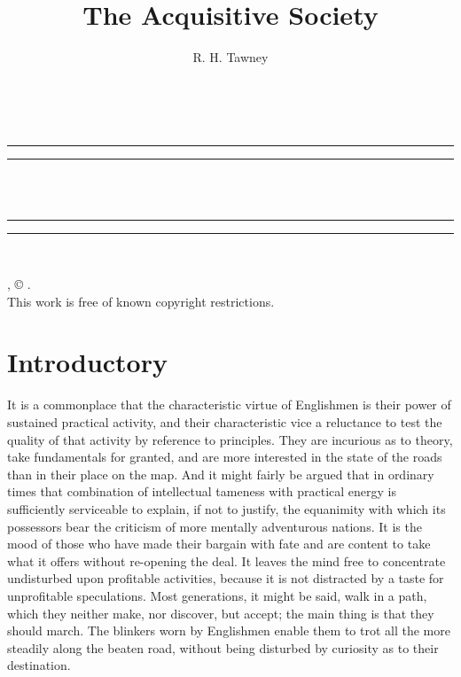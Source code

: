 \documentclass{book}
\date{}
\title{The Acquisitive Society}
\author{R. H. Tawney}
\begin{document}
\thispagestyle{empty}
\begin{center}
	{\Huge \@title   \\[5mm]}
\end{center}
\newpage
\thispagestyle{empty}
\cleardoublepage
\begin{center}
	\thispagestyle{empty}
	\vspace*{\baselineskip}
	\rule{\textwidth}{1.6pt}\vspace*{-\baselineskip}\vspace*{2pt}
	\rule{\textwidth}{0.4pt}\\[\baselineskip]
	{\Huge\scshape \@title   \\[5mm]}
	{\Large }
	\rule{\textwidth}{0.4pt}\vspace*{-\baselineskip}\vspace{3.2pt}
	\rule{\textwidth}{1.6pt}\\[\baselineskip]
	\vspace*{4\baselineskip}
	{\Large \@author}
	\vfill
\end{center}
\pagebreak
\newpage
\thispagestyle{empty}
\null\vfill
\noindent
\begin{center}
	{\emph{\@title}, © \@author.\\[5mm]}
	{This work is free of known copyright restrictions.\\[5mm]}
\end{center}
\pagebreak
\newpage
\setcounter{tocdepth}{0}
\setcounter{secnumdepth}{0}

\chapter{Introductory}
\label{chapter-0}
It is a commonplace that the characteristic virtue of Englishmen is their power of sustained practical activity, and their characteristic vice a reluctance to test the quality of that activity by reference to principles. They are incurious as to theory, take fundamentals for granted, and are more interested in the state of the roads than in their place on the map. And it might fairly be argued that in ordinary times that combination of intellectual tameness with practical energy is sufficiently serviceable to explain, if not to justify, the equanimity with which its possessors bear the criticism of more mentally adventurous nations. It is the mood of those who have made their bargain with fate and are content to take what it offers without re-opening the deal. It leaves the mind free to concentrate undisturbed upon profitable activities, because it is not distracted by a taste for unprofitable speculations. Most generations, it might be said, walk in a path, which they neither make, nor discover, but accept; the main thing is that they should march. The blinkers worn by Englishmen enable them to trot all the more steadily along the beaten road, without being disturbed by curiosity as to their destination.
\end{document}
